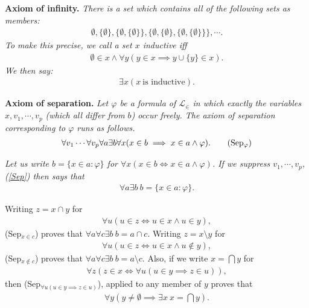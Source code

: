 \documentclass{book}
\newcommand{\titl}[1]{\noindent\textbf{#1}}
\begin{document}
\begin{framed}
\titl{Axiom of infinity.} \emph{There is a set which contains all of the following sets as members:}
    \begin{align*}
        \emptyset,\{\emptyset\},\{\emptyset,\{\emptyset\}\},\{\emptyset,\{\emptyset\},\{\emptyset,\{\emptyset\}\}\},\cdots.
    \end{align*}
\emph{To make this precise, we call a set $x$ inductive iff}
    \begin{align*}
        \emptyset\in x\land\forall y(y\in x\implies y\cup\{y\}\in x).
    \end{align*}
\emph{We then say:}
    \begin{align*}
        \exists x(x\ \textrm{is inductive}).\tag{Inf}\label{Inf}
    \end{align*}
\end{framed}

\begin{framed}
\titl{Axiom of separation.} \emph{Let $\varphi$ be a formula of $\mathscr{L}_{\in}$ in which exactly the variables $x,v_1,\cdots,v_p$ (which all differ from $b$) occur freely. The axiom of separation corresponding to $\varphi$ runs as follows.}
    \begin{align*}
        \forall v_1\cdots\forall v_p\forall a\exists b\forall x(x\in b\implies x\in a\land\varphi).\tag{Sep$_{\varphi}$}\label{Sep}
    \end{align*}

\emph{Let us write $b=\{x\in a:\varphi\}$ for $\forall x(x\in b\iff x\in a\land\varphi)$. If we suppress $v_1,\cdots,v_p$,
(\ref{Sep}) then says that}
    \begin{align*}
        \forall a\exists b\ b=\{x\in a:\varphi\}.
    \end{align*}
\end{framed}

Writing $z=x\cap y$ for
    \begin{align*}
        \forall u(u\in z\iff u\in x\land u\in y),
    \end{align*}
(Sep$_{x\in c}$) proves that $\forall a\forall c\exists b\ b=a\cap c$. Writing $z=x\setminus y$ for
    \begin{align*}
        \forall u(u\in z\iff u\in x\land u\notin y),
    \end{align*}
(Sep$_{x\notin c}$) proves that $\forall a\forall c\exists b\ b=a\setminus c$. Also, if we write $x=\bigcap y$ for
    \begin{align*}
        \forall z(z\in x\iff\forall u(u\in y\implies z\in u)),
    \end{align*}
then (Sep$_{\forall u(u\in y\implies z\in u)}$), applied to any member of $y$ proves that
    \begin{align*}
        \forall y(y\neq\emptyset\implies \exists x\ x=\bigcap y).
    \end{align*}
\end{document}
